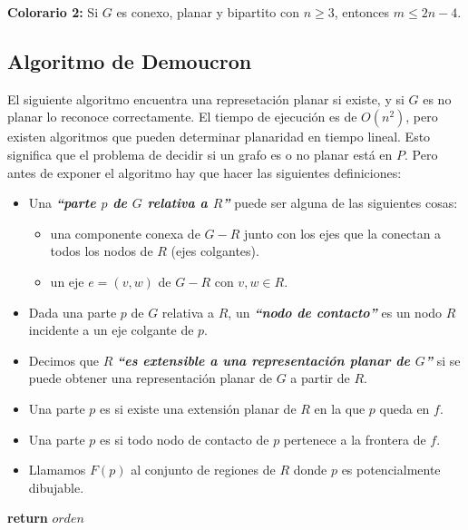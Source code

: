 \begin{badidea}
\textbf{Colorario 2:} Si $G$ es conexo, planar y bipartito con $n \geq 3$, entonces $m \leq 2n - 4$.
\end{badidea}

\subsection{Algoritmo de Demoucron}

El siguiente algoritmo encuentra una represetaci\'on planar si existe, y si $G$ es no planar lo reconoce correctamente. El tiempo de ejecuci\'on es de $O(n^2)$, pero existen algoritmos que pueden determinar planaridad en tiempo lineal. Esto significa que el problema de decidir si un grafo es o no planar est\'a en $P$. Pero antes de exponer el algoritmo hay que hacer las siguientes definiciones:

\begin{itemize}
\item Una \textbf{\emph{``parte $p$ de $G$ relativa a $R$''}} puede ser alguna de las siguientes cosas:
    \begin{itemize}
    \item una componente conexa de $G - R$ junto con los ejes que la conectan a todos los nodos de $R$ (ejes colgantes).
    \item un eje $e = (v, w)$ de $G - R$ con $v,w \in R$.
    \end{itemize}
\item Dada una parte $p$ de $G$ relativa a $R$, un \textbf{\emph{``nodo de contacto''}} es un nodo $R$ incidente a un eje colgante de $p$.
\item Decimos que $R$ \textbf{\emph{``es extensible a una representaci\'on planar de $G$''}} si se puede obtener una representaci\'on planar de $G$ a partir de $R$.
\item Una parte $p$ es \textbf{} si existe una extensi\'on planar de $R$ en la que $p$ queda en $f$.
\item Una parte $p$ es \textbf{} si todo nodo de contacto de $p$ pertenece a la frontera de $f$.
\item Llamamos \textbf{$F(p)$} al conjunto de regiones de $R$ donde $p$ es potencialmente dibujable.
\end{itemize}

\begin{algorithm}
\begin{algorithmic}[1]
  \State \textbf{return} $orden$
\EndFunction
\end{algorithmic}
\end{algorithm}